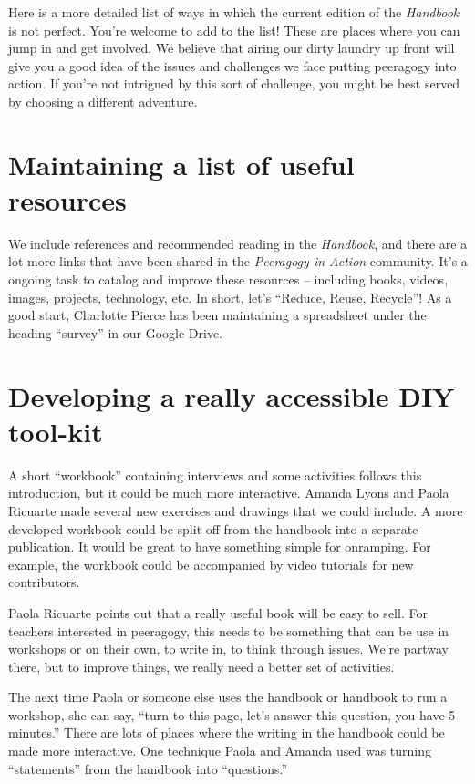 Here is a more detailed list of ways in which the current edition of the
\emph{Handbook} is not perfect. You're welcome to add to the list! These
are places where you can jump in and get involved. We believe that
airing our dirty laundry up front will give you a good idea of the
issues and challenges we face putting peeragogy into action. If you're
not intrigued by this sort of challenge, you might be best served by choosing
a different adventure.

\section*{Maintaining a list of useful
resources}\label{maintaining-a-list-of-useful-resources}

We include references and recommended reading in the \emph{Handbook},
and there are a lot more links that have been shared in the \emph{Peeragogy in
Action} community. It's a ongoing task to catalog and improve these
resources -- including books, videos, images, projects, technology, etc.
In short, let's ``Reduce, Reuse, Recycle''! As a good start, Charlotte
Pierce has been maintaining a spreadsheet under the heading ``survey''
in our Google Drive.

\section*{Developing a really accessible DIY
tool-kit}\label{developing-a-really-accessible-diy-tool-kit}

A short ``workbook'' containing interviews and some activities follows
this introduction, but it could be much more interactive. Amanda Lyons
and Paola Ricuarte made several new exercises and drawings that we could
include. A more developed workbook could be split off from the handbook
into a separate publication. It would be great to have something simple
for onramping. For example, the workbook could be accompanied by video
tutorials for new contributors.

Paola Ricuarte points out that a really useful book will be easy to
sell. For teachers interested in peeragogy, this needs to be something
that can be use in workshops or on their own, to write in, to think
through issues. We're partway there, but to improve things, we really
need a better set of activities.

The next time Paola or someone else uses the handbook or handbook to run
a workshop, she can say, ``turn to this page, let's answer this
question, you have 5 minutes.'' There are lots of places where the
writing in the handbook could be made more interactive. One technique
Paola and Amanda used was turning ``statements'' from the handbook into
``questions.''

